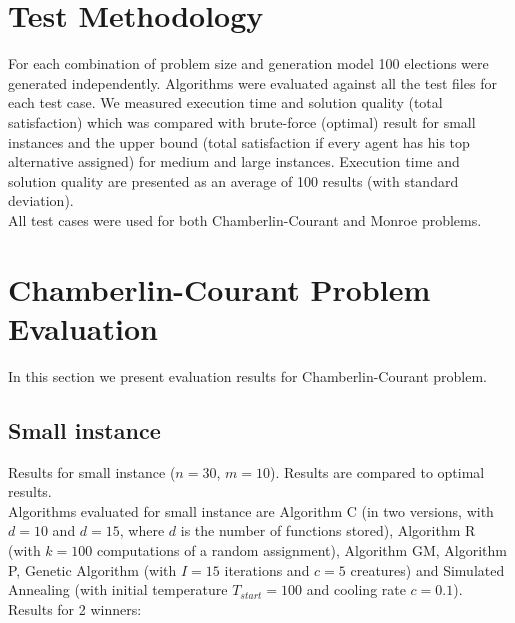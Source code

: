 \section{Test Methodology}

For each combination of problem size and generation model 100 elections were generated independently. Algorithms were evaluated against all the test files for each test case. We measured execution time and solution quality (total satisfaction) which was compared with brute-force (optimal) result for small instances and the upper bound (total satisfaction if every agent has his top alternative assigned) for medium and large instances. Execution time and solution quality are presented as an average of 100 results (with standard deviation).
\\

All test cases were used for both Chamberlin-Courant and Monroe problems.

\section{Chamberlin-Courant Problem Evaluation}

In this section we present evaluation results for Chamberlin-Courant problem.

\subsection{Small instance}

Results for small instance ($n = 30$, $m = 10$). Results are compared to optimal results.
\\

Algorithms evaluated for small instance are Algorithm C (in two versions, with $d = 10$ and $d = 15$, where $d$ is the number of functions stored), Algorithm R (with $k = 100$ computations of a random assignment), Algorithm GM, Algorithm P, Genetic Algorithm (with $I = 15$ iterations and $c = 5$ creatures) and Simulated Annealing (with initial temperature $T_{start} = 100$ and cooling rate $c = 0.1$).
\\

Results for 2 winners:
\\

